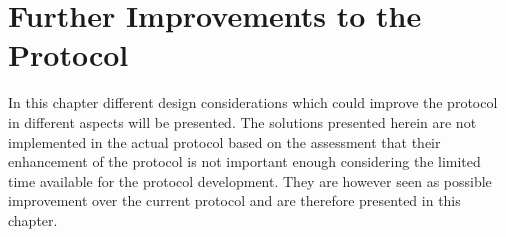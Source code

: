 \chapter{Further Improvements to the Protocol}\label{mortenStuff}
\vspace{-5pt}
In this chapter different design considerations which could improve the protocol in different aspects will be presented.
The solutions presented herein are not implemented in the actual protocol based on the assessment that their enhancement of the protocol is not important enough considering the limited time available for the protocol development. 
They are however seen as possible improvement over the current protocol and are therefore presented in this chapter. 



